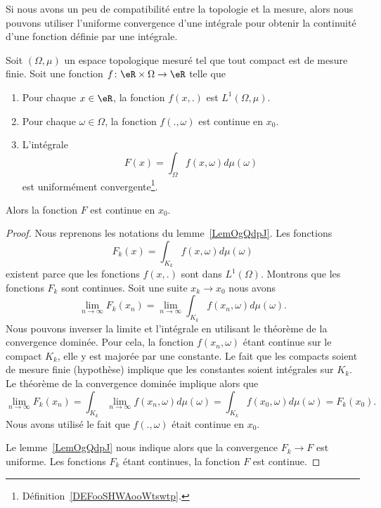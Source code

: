 Si nous avons un peu de compatibilité entre la topologie et la mesure, alors nous pouvons utiliser l'uniforme convergence d'une intégrale pour obtenir la continuité d'une fonction définie par une intégrale.

\begin{theorem} \label{ThotexmgE}
    Soit \( (\Omega,\mu)\) un espace topologique mesuré tel que tout compact est de mesure finie. Soit une fonction \( f\colon \eR\times \Omega\to \eR\) telle que
    \begin{enumerate}
        \item
            Pour chaque \( x\in \eR\), la fonction \( f(x,.)\) est \( L^1(\Omega,\mu)\).
        \item
            Pour chaque \( \omega\in \Omega\), la fonction \( f(.,\omega)\) est continue en \( x_0\).
        \item
            L'intégrale
            \begin{equation}
                F(x)=\int_{\Omega}f(x,\omega)d\mu(\omega)
            \end{equation}
            est uniformément convergente\footnote{Définition~\ref{DEFooSHWAooWtswtp}.}.
    \end{enumerate}
    Alors la fonction \( F\) est continue en \( x_0\).
\end{theorem}

\begin{proof}
    Nous reprenons les notations du lemme~\ref{LemOgQdpJ}. Les fonctions
    \begin{equation}
        F_k(x)=\int_{K_k}f(x,\omega)d\mu(\omega)
    \end{equation}
    existent parce que les fonctions \( f(x,.)\) sont dans \( L^1(\Omega)\). Montrons que les fonctions \( F_k\) sont continues. Soit une suite \( x_k\to x_0\) nous avons
    \begin{equation}
        \lim_{n\to \infty} F_k(x_n)=\lim_{n\to \infty} \int_{K_k}f(x_n,\omega)d\mu(\omega).
    \end{equation}
    Nous pouvons inverser la limite et l'intégrale en utilisant le théorème de la convergence dominée. Pour cela, la fonction \( f(x_n,\omega)\) étant continue sur le compact \( K_k\), elle y est majorée par une constante. Le fait que les compacts soient de mesure finie (hypothèse) implique que les constantes soient intégrales sur \( K_k\). Le théorème de la convergence dominée implique alors que
    \begin{equation}
        \lim_{n\to \infty} F_k(x_n)=\int_{K_k}\lim_{n\to \infty} f(x_n,\omega)d\mu(\omega)=\int_{K_k}f(x_0,\omega)d\mu(\omega)=F_k(x_0).
    \end{equation}
    Nous avons utilisé le fait que \( f(.,\omega)\) était continue en \( x_0\).

    Le lemme~\ref{LemOgQdpJ} nous indique alors que la convergence \( F_k\to F\) est uniforme. Les fonctions \( F_k\) étant continues, la fonction \( F\) est continue.
\end{proof}

